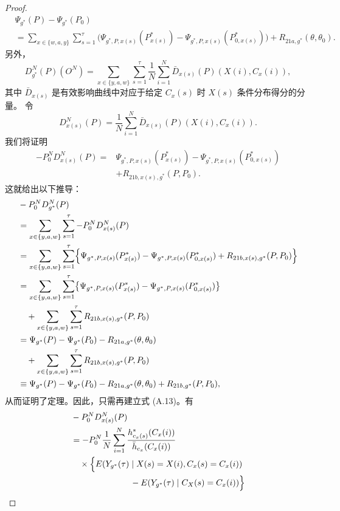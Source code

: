 \begin{proof}
\[\begin{aligned}
&\Psi_{g^*}(P)-\Psi_{g^*}(P_0)\\
&=\sum_{x\in\{w,a,y\}}\sum_{s=1}^{\tau}
 \bigl(\Psi_{g^*,P,x(s)}(P^*_{x(s)})
 -\Psi_{g^*,P,x(s)}(P^*_{0,x(s)})\bigr)
 +R_{21a,g^*}(\theta,\theta_0).
\end{aligned}
\]
另外，
\[
D_{g^*}^N(P)(O^N)
 =\sum_{x\in\{y,a,w\}}\sum_{s=1}^{\tau}\frac1N\sum_{i=1}^N
 \bar D_{x(s)}(P)(X(i),C_x(i)),
\]
其中 $\bar D_{x(s)}$ 是有效影响曲线中对应于给定 $C_x(s)$ 时 $X(s)$ 条件分布得分的分量。
令
\[
D_{x(s)}^N(P)=\frac1N\sum_{i=1}^N\bar D_{x(s)}(P)(X(i),C_x(i)).
\]
我们将证明
\begin{equation}
\begin{aligned}
-P_0^ND_{x(s)}^N(P)
={}&\Psi_{g^*,P,x(s)}(P^*_{x(s)})
 -\Psi_{g^*,P,x(s)}(P^*_{0,x(s)})\\
&+R_{21b,x(s),g^*}(P,P_0).
\end{aligned}
\tag{A.13}
\end{equation}
这就给出以下推导：
\[
\begin{aligned}
&-P_0^ND_{g^*}^N(P)\\
&=\sum_{x\in\{y,a,w\}}\sum_{s=1}^{\tau}-P_0^ND_{x(s)}^N(P)\\
&=\sum_{x\in\{y,a,w\}}\sum_{s=1}^{\tau}
 \Bigl\{\Psi_{g^*,P,x(s)}(P^*_{x(s)})
 -\Psi_{g^*,P,x(s)}(P^*_{0,x(s)})
 +R_{21b,x(s),g^*}(P,P_0)\Bigr\}\\
&=\sum_{x\in\{y,a,w\}}\sum_{s=1}^{\tau}
 \bigl\{\Psi_{g^*,P,x(s)}(P^*_{x(s)})
 -\Psi_{g^*,P,x(s)}(P^*_{0,x(s)})\bigr\}\\
&\quad+\sum_{x\in\{y,a,w\}}\sum_{s=1}^{\tau}R_{21b,x(s),g^*}(P,P_0)\\
&=\Psi_{g^*}(P)-\Psi_{g^*}(P_0)-R_{21a,g^*}(\theta,\theta_0)\\
&\quad+\sum_{x\in\{y,a,w\}}\sum_{s=1}^{\tau}R_{21b,x(s),g^*}(P,P_0)\\
&\equiv\Psi_{g^*}(P)-\Psi_{g^*}(P_0)-R_{21a,g^*}(\theta,\theta_0)
 +R_{21b,g^*}(P,P_0),
\end{aligned}
\]
从而证明了定理。因此，只需再建立式 (A.13)。有
\[
\begin{aligned}
&-P_0^ND_{x(s)}^N(P)\\
&=-P_0^N\frac1N\sum_{i=1}^N
 \frac{h^*_{c_x(s)}(C_x(i))}{\bar h_{c_x}(C_x(i))}\\
&\quad\times\Bigl\{E(Y_{g^*}(\tau)\mid X(s)=X(i),C_x(s)=C_x(i))\\
&\hspace{7em}-E(Y_{g^*}(\tau)\mid C_X(s)=C_x(i))\Bigr\}\\

\end{aligned}\]
\end{proof}

